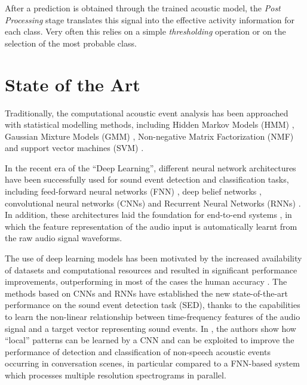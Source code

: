 After a prediction is obtained through the trained acoustic model, the \textit{Post Processing} stage translates this signal into the effective activity information for each class. Very often this relies on a simple \textit{thresholding} operation or on the selection of the most probable class.


\section{State of the Art}

Traditionally, the computational acoustic event analysis has been approached with statistical modelling methods, including Hidden Markov Models (HMM) \cite{degara2011onset}, Gaussian Mixture Models (GMM) \cite{heittola2010audio}, Non-negative Matrix Factorization (NMF) \cite{carabias2011musical} and support vector machines (SVM) \cite{guo2003content}. 

In the recent era of the ``Deep Learning'', different neural network architectures have been successfully used for sound event detection and classification tasks, including feed-forward neural networks (FNN) \cite{mcloughlin2015robust}, deep belief networks \cite{mohamed2012acoustic}, convolutional neural networks (CNNs) \cite{piczak2015environmental} and Recurrent Neural Networks (RNNs) \cite{graves2013speech}. In addition, these architectures laid the foundation for end-to-end systems \cite{trigeorgis2016adieu, wu2017end}, in which the feature representation of the audio input is automatically learnt from the raw audio signal waveforms. 

The use of deep learning models has been motivated by the increased availability of datasets and computational resources and resulted in significant performance improvements, outperforming in most of the cases the human accuracy \cite{sailor2017unsupervised}.
The methods based on CNNs and RNNs have established the new state-of-the-art performance on the sound event detection task (SED), thanks to the capabilities to learn the non-linear relationship between time-frequency features of the audio signal and a target vector representing sound events. In \cite{espi2015}, the authors show how ``local'' patterns can be learned by a CNN and can be exploited to improve the performance of detection and classification of non-speech acoustic events occurring in conversation scenes, in particular compared to a FNN-based system which processes multiple resolution spectrograms in parallel. 

